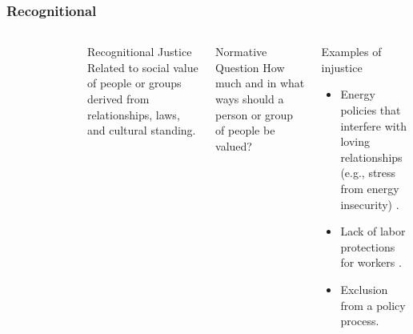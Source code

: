 \begin{frame}
    \frametitle{Recognitional}
    \begin{columns}
        \column[t]{3cm}
        \begin{figure}
            \centering
        \end{figure}
        \column[t]{7cm}
        \begin{block}{Recognitional Justice}
            Related to social value of people or groups derived from
            relationships, laws, and cultural standing.
        \end{block}
        \begin{block}{Normative Question}
            How much and in what ways should a person or group of people be
            valued?
        \end{block}
        \begin{block}{Examples of injustice}
            \begin{itemize}
                \item Energy policies that interfere with loving relationships
                (e.g., stress from energy
                insecurity) \cite{van_uffelen_revisiting_2022}.
                \item Lack of labor protections for
                workers \cite{van_uffelen_revisiting_2022}.
                \item Exclusion from a policy process\cite{van_uffelen_revisiting_2022}.
            \end{itemize}
        \end{block}
    \end{columns}
    
\end{frame}

